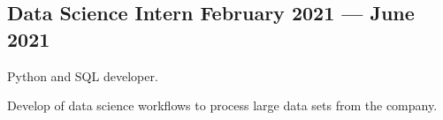 \documentclass[letter,10pt]{article}
\begin{document}
\subsection{{Data Science Intern 
\hfill February 2021 --- June 2021}}
\begin{zitemize}
\item Python and SQL developer.
\item Develop of data science workflows to process large data sets from the company.
\end{zitemize}




\end{document}
